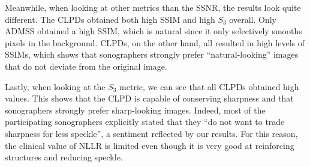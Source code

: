 Meanwhile, when looking at other metrics than the SSNR, the results look quite different.
The CLPDs obtained both high SSIM and high \(S_3\) overall.
Only ADMSS obtained a high SSIM, which is natural since it only selectively smooths pixels in the background.
CLPDs, on the other hand, all resulted in high levels of SSIMs, which shows that sonographers strongly prefer ``natural-looking'' images that do not deviate from the original image.

Lastly, when looking at the \(S_3\) metric, we can see that all CLPDs obtained high values.
This shows that the CLPD is capable of conserving sharpness and that sonographers strongly prefer sharp-looking images.
Indeed, most of the participating sonographers explicitly stated that they ``do not want to trade sharpness for less speckle'', a sentiment reflected by our results.
For this reason, the clinical value of NLLR is limited even though it is very good at reinforcing structures and reducing speckle.

